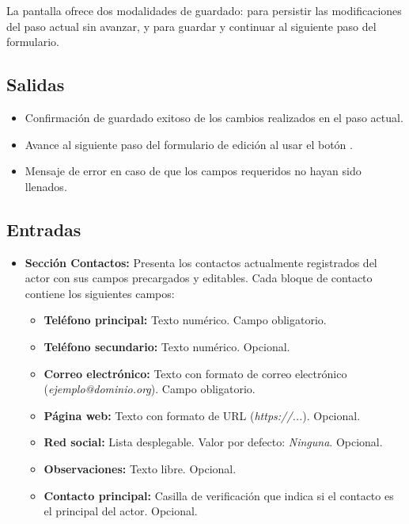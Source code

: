 La pantalla ofrece dos modalidades de guardado:  
para persistir las modificaciones del paso actual sin avanzar, y 
 para guardar y continuar al siguiente paso del formulario.


\subsection{Salidas}
\begin{itemize}
	\item Confirmación de guardado exitoso de los cambios realizados en el paso 
	actual.
	\item Avance al siguiente paso del formulario de edición al usar el botón 
	.
	\item Mensaje de error  en 
	caso de que los campos requeridos no hayan sido llenados.
\end{itemize}

\subsection{Entradas}
\begin{itemize}
	\item \textbf{Sección Contactos:} Presenta los contactos actualmente 
	registrados del actor con sus campos precargados y editables. Cada bloque 
	de contacto contiene los siguientes campos:
	\begin{itemize}
		\item \textbf{Teléfono principal:} Texto numérico. Campo obligatorio.
		\item \textbf{Teléfono secundario:} Texto numérico. Opcional.
		\item \textbf{Correo electrónico:} Texto con formato de correo 
		electrónico (\textit{ejemplo@dominio.org}). Campo obligatorio.
		\item \textbf{Página web:} Texto con formato de URL 
		(\textit{https://...}). Opcional.
		\item \textbf{Red social:} Lista desplegable. Valor por defecto: 
		\textit{Ninguna}. Opcional.
		\item \textbf{Observaciones:} Texto libre. Opcional.
		\item \textbf{Contacto principal:} Casilla de verificación que indica 
		si el contacto es el principal del actor. Opcional.
	\end{itemize}
\end{itemize}

